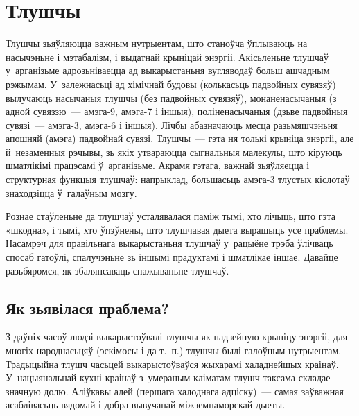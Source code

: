 \chapter{Тлушчы}

Тлушчы зьяўляюцца важным нутрыентам, што станоўча ўплываюць на насычэньне і мэтабалізм, і выдатнай крыніцай энэргіі. Акісьленьне тлушчаў у~арганізьме адрозьніваецца ад выкарыстаньня вугляводаў больш ашчадным рэжымам. У~залежнасьці ад хімічнай будовы (колькасьць падвойных сувязяў) вылучаюць насычаныя тлушчы (без падвойных сувязяў), монаненасычаныя (з адной сувяззю~--- амэга-9, амэга-7 і іншыя), поліненасычаныя (дзьве падвойныя сувязі~--- амэга-3, амэга-6 і іншыя). Лічбы абазначаюць месца разьмяшчэньня апошняй (амэга) падвойнай сувязі. Тлушчы~--- гэта ня толькі крыніца энэргіі, але й~незаменныя рэчывы, зь якіх утвараюцца сыгнальныя малекулы, што кіруюць шматлікімі працэсамі ў~арганізьме. Акрамя гэтага, важнай зьяўляецца і структурная функцыя тлушчаў: напрыклад, большасьць амэга-3 тлустых кіслотаў знаходзіцца ў~галаўным мозгу.

Рознае стаўленьне да тлушчаў усталявалася паміж тымі, хто лічыць, што гэта «шкодна», і тымі, хто ўпэўнены, што тлушчавая дыета вырашыць усе праблемы. Насамрэч для правільнага выкарыстаньня тлушчаў у~рацыёне трэба ўлічваць спосаб гатоўлі, спалучэньне зь іншымі прадуктамі і шматлікае іншае. Давайце разьбяромся, як збалянсаваць спажываньне тлушчаў.


\section{Як зьявілася праблема?}

З даўніх часоў людзі выкарыстоўвалі тлушчы як надзейную крыніцу энэргіі, для многіх народнасьцяў (эскімосы і да т.~п.) тлушчы былі галоўным нутрыентам. Традыцыйна тлушч часьцей выкарыстоўваўся жыхарамі халаднейшых краінаў. У~нацыянальнай кухні краінаў з~умераным кліматам тлушч таксама складае значную долю. Аліўкавы алей (першага халоднага адціску)~--- самая заўважная асаблівасьць вядомай і добра вывучанай міжземнаморскай дыеты.

